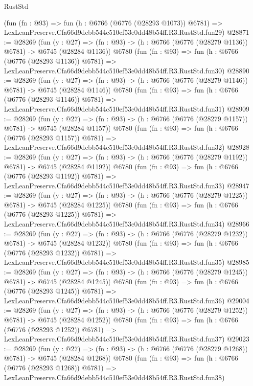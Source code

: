 \begin{lexlean}{RustStd}
\begin{coremodule}
    (fun (fn : @93) =>
    fun (h : @6766 (@6776 (@28293 @1073)) @6781) =>
    LexLeanPreserve.Cfa66d9debb544c510ef53e0dd48b54ff.R3.RustStd.fun29)
@28871 := @28269
    (fun (y : @27) =>
    (fn : @93) -> (h : @6766 (@6776 (@28279 @1136)) @6781) -> @6745 (@28284 @1136))
    @6780
    (fun (fn : @93) =>
    fun (h : @6766 (@6776 (@28293 @1136)) @6781) =>
    LexLeanPreserve.Cfa66d9debb544c510ef53e0dd48b54ff.R3.RustStd.fun30)
@28890 := @28269
    (fun (y : @27) =>
    (fn : @93) -> (h : @6766 (@6776 (@28279 @1146)) @6781) -> @6745 (@28284 @1146))
    @6780
    (fun (fn : @93) =>
    fun (h : @6766 (@6776 (@28293 @1146)) @6781) =>
    LexLeanPreserve.Cfa66d9debb544c510ef53e0dd48b54ff.R3.RustStd.fun31)
@28909 := @28269
    (fun (y : @27) =>
    (fn : @93) -> (h : @6766 (@6776 (@28279 @1157)) @6781) -> @6745 (@28284 @1157))
    @6780
    (fun (fn : @93) =>
    fun (h : @6766 (@6776 (@28293 @1157)) @6781) =>
    LexLeanPreserve.Cfa66d9debb544c510ef53e0dd48b54ff.R3.RustStd.fun32)
@28928 := @28269
    (fun (y : @27) =>
    (fn : @93) -> (h : @6766 (@6776 (@28279 @1192)) @6781) -> @6745 (@28284 @1192))
    @6780
    (fun (fn : @93) =>
    fun (h : @6766 (@6776 (@28293 @1192)) @6781) =>
    LexLeanPreserve.Cfa66d9debb544c510ef53e0dd48b54ff.R3.RustStd.fun33)
@28947 := @28269
    (fun (y : @27) =>
    (fn : @93) -> (h : @6766 (@6776 (@28279 @1225)) @6781) -> @6745 (@28284 @1225))
    @6780
    (fun (fn : @93) =>
    fun (h : @6766 (@6776 (@28293 @1225)) @6781) =>
    LexLeanPreserve.Cfa66d9debb544c510ef53e0dd48b54ff.R3.RustStd.fun34)
@28966 := @28269
    (fun (y : @27) =>
    (fn : @93) -> (h : @6766 (@6776 (@28279 @1232)) @6781) -> @6745 (@28284 @1232))
    @6780
    (fun (fn : @93) =>
    fun (h : @6766 (@6776 (@28293 @1232)) @6781) =>
    LexLeanPreserve.Cfa66d9debb544c510ef53e0dd48b54ff.R3.RustStd.fun35)
@28985 := @28269
    (fun (y : @27) =>
    (fn : @93) -> (h : @6766 (@6776 (@28279 @1245)) @6781) -> @6745 (@28284 @1245))
    @6780
    (fun (fn : @93) =>
    fun (h : @6766 (@6776 (@28293 @1245)) @6781) =>
    LexLeanPreserve.Cfa66d9debb544c510ef53e0dd48b54ff.R3.RustStd.fun36)
@29004 := @28269
    (fun (y : @27) =>
    (fn : @93) -> (h : @6766 (@6776 (@28279 @1252)) @6781) -> @6745 (@28284 @1252))
    @6780
    (fun (fn : @93) =>
    fun (h : @6766 (@6776 (@28293 @1252)) @6781) =>
    LexLeanPreserve.Cfa66d9debb544c510ef53e0dd48b54ff.R3.RustStd.fun37)
@29023 := @28269
    (fun (y : @27) =>
    (fn : @93) -> (h : @6766 (@6776 (@28279 @1268)) @6781) -> @6745 (@28284 @1268))
    @6780
    (fun (fn : @93) =>
    fun (h : @6766 (@6776 (@28293 @1268)) @6781) =>
    LexLeanPreserve.Cfa66d9debb544c510ef53e0dd48b54ff.R3.RustStd.fun38)

\end{coremodule}
\end{lexlean}
